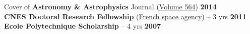 \documentclass[11pt]{article}
\begin{document}
\vspace{-0.2cm}
Cover of \textbf{Astronomy \& Astrophysics} Journal (\href{https://www.aanda.org/articles/aa/abs/2014/04/contents/contents.html}{Volume 564}) \hfill  \textbf{2014}\\


\vspace{-0.2cm}
\textbf{CNES Doctoral Research Fellowship} (\href{https://cnes.fr/en/web/CNES-en/7430-research-grants.php}{French space agency}) -- 3 yrs  \hfill   \textbf{2011}\\ %

\vspace{-0.2cm}
\textbf{Ecole Polytechnique Scholarship} -- 4 yrs   \hfill   \textbf{2007}\\

\end{document}
